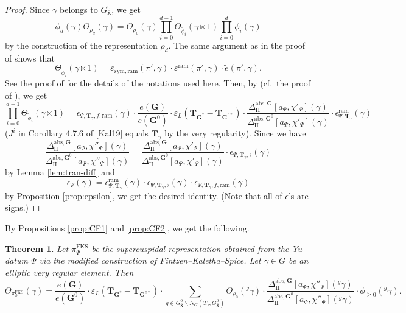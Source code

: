 \documentclass{amsart}
\newcommand{\abs}{\mathrm{abs}}
\newcommand{\ram}{\mathrm{ram}}
\newcommand{\sym}{\mathrm{sym}}
\newcommand{\FKS}{\mathrm{FKS}}
\newcommand{\bfT}{\mathbf{T}}
\newcommand{\x}{\mathbf{x}}
\newcommand{\bfG}{\mathbf{G}}
\newcommand{\II}{\mathrm{II}}
\theoremstyle{plain}
\newtheorem{thm}{Theorem}[section]
\theoremstyle{definition}
\theoremstyle{remark}
\theoremstyle{theorem}
\begin{document}
\begin{proof}
Since $\gamma$ belongs to $G^{0}_{\bar{\x}}$, we get
\[
\phi_{d}(\gamma)\Theta_{\rho_{d}}(\gamma)
=
\Theta_{\rho_{0}}(\gamma)
\prod_{i=0}^{d-1}\Theta_{\tilde{\phi}_{i}}(\gamma\ltimes1)
\prod_{i=0}^{d}\phi_{i}(\gamma)
\]
by the construction of the representation $\rho_{d}$.
The same argument as in the proof of \cite[Proposition 4.9]{CO21} shows that
\[
\Theta_{\tilde{\phi}_{i}}(\gamma\ltimes1)
=
\varepsilon_{\sym,\ram}(\pi',\gamma)\cdot\varepsilon^{\ram}(\pi',\gamma)\cdot\tilde{e}(\pi',\gamma).
\]
See the proof of \cite[Proposition 4.9]{CO21} for the details of the notations used here.
Then, by \cite[Corollary 4.7.6]{Kal19} (cf.\ the proof of \cite[Corollary 4.10.1]{Kal19}), we get
\[
\prod_{i=0}^{d-1}\Theta_{\tilde{\phi}_{i}}(\gamma\ltimes1)
=
\epsilon_{\Psi,\bfT_{\gamma},f,\ram}(\gamma)\cdot\frac{e(\bfG)}{e(\bfG^{0})}\cdot \varepsilon_{L}(\bfT_{\bfG^{\ast}}-\bfT_{\bfG^{0\ast}})
\cdot\frac{\Delta_{\II}^{\abs,\bfG}[a_{\Psi},\chi'_{\Psi}](\gamma)}{\Delta_{\II}^{\abs,\bfG^{0}}[a_{\Psi},\chi'_{\Psi}](\gamma)}
\cdot\epsilon_{\Psi,\bfT_{\gamma}}^{\ram}(\gamma)
\]
($J^{i}$ in Corollary 4.7.6 of [Kal19] equals $\bfT_{\gamma}$ by the very regularity).
Since we have
\[
\frac{\Delta_{\II}^{\abs,\bfG}[a_{\Psi},\chi''_{\Psi}](\gamma)}{\Delta_{\II}^{\abs,\bfG^{0}}[a_{\Psi},\chi''_{\Psi}](\gamma)}
=\frac{\Delta_{\II}^{\abs,\bfG}[a_{\Psi},\chi'_{\Psi}](\gamma)}{\Delta_{\II}^{\abs,\bfG^{0}}[a_{\Psi},\chi'_{\Psi}](\gamma)}
\cdot\epsilon_{\Psi,\bfT_{\gamma},\flat}(\gamma)
\]
by Lemma \ref{lem:tran-diff} and
\[
\epsilon_{\Psi}(\gamma)=\epsilon_{\Psi,\bfT_{\gamma}}^{\ram}(\gamma)\cdot\epsilon_{\Psi,\bfT_{\gamma},\flat}(\gamma)\cdot\epsilon_{\Psi,\bfT_{\gamma},f,\ram}(\gamma)
\]
by Proposition \ref{prop:epsilon}, we get the desired identity.
(Note that all of $\epsilon$'s are signs.)
\end{proof}

By Propositions \ref{prop:CF1} and \ref{prop:CF2}, we get the following.

\begin{thm}\label{thm:CF}
Let $\pi^{\FKS}_{\Psi}$ be the supercuspidal representation obtained from the Yu-datum $\Psi$ via the modified construction of Fintzen--Kaletha--Spice.
Let $\gamma \in G$ be an elliptic very regular element.
Then
\[
\Theta_{\pi^{\FKS}_{\Psi}}(\gamma)
=
\frac{e(\bfG)}{e(\bfG^{0})}\cdot \varepsilon_{L}(\bfT_{\bfG^{\ast}}-\bfT_{\bfG^{0\ast}})\cdot
\sum_{g \in G^{0}_{\bar{\x}}\backslash N_{G}(T_{\gamma},G^{0}_{\bar{\x}})}\Theta_{\rho_{0}}({}^{g}\gamma)\cdot\frac{\Delta_{\II}^{\abs,\bfG}[a_{\Psi},\chi''_{\Psi}]({}^{g}\gamma)}{\Delta_{\II}^{\abs,\bfG^{0}}[a_{\Psi},\chi''_{\Psi}]({}^{g}\gamma)}\cdot\phi_{\geq0}({}^{g}\gamma).
\]
\end{thm}
\end{document}
